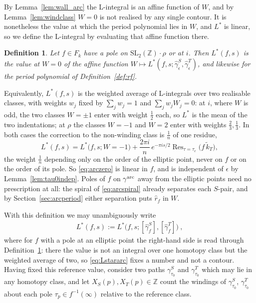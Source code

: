 \documentclass[11pt]{article}
\newtheorem{definition}[theorem]{Definition}
\newcommand{\ZZ}{\mathbb{Z}}
\newcommand{\SLZ}{\mathrm{SL}_2(\ZZ)}
\newcommand{\tk}{\widetilde{k}_T}
\DeclareMathOperator{\Res}{Res}
\begin{document}
By Lemma~\ref{lem:wall_arc} the L-integral is an affine function of $W$, and by
Lemma~\ref{lem:windclass} $W=0$ is not realised by any single contour. It is nonetheless the value
at which the period polynomial lies in $W$, and $L^*$ is linear, so we define the L-integral by
evaluating that affine function there.

\begin{definition}\label{def:arczero}
Let $f\in F_k$ have a pole on $\SLZ\!\cdot\!\rho$ or at $i$. Then $L^*(f,s)$ is the value at
$W=0$ of the affine function $W\mapsto L^*(f,s;\hat\gamma^S_\epsilon,\hat\gamma^T_\epsilon)$, and
likewise for the period polynomial of Definition~\ref{def:rf}.
\end{definition}

Equivalently, $L^*(f,s)$ is the weighted average of L-integrals over two realisable classes, with
weights $w_j$ fixed by $\sum_jw_j=1$ and $\sum_jw_jW_j=0$: at $i$, where $W$ is odd, the two
classes $W=\pm1$ enter with weight $\tfrac12$ each, so $L^*$ is the mean of the two indentations;
at $\rho$ the classes $W=-1$ and $W=2$ enter with weights $\tfrac23,\tfrac13$. In both cases the
correction to the non-winding class is $\tfrac1n$ of one residue,
\begin{equation}\label{eq:arczero}
L^*(f,s)=L^*\big(f,s;W=-1\big)+\frac{2\pi i}{n}\,e^{-\pi is/2}\Res_{\tau=\tau_e}\!\big(f\,\tk\big),
\end{equation}
the weight $\tfrac1n$ depending only on the order of the elliptic point, never on $f$ or on the
order of its pole. So \eqref{eq:arczero} is linear in $f$, and is independent of $\epsilon$ by
Lemma~\ref{lem:tau0indep}. Poles of $f$ on $\gamma^{\rm arc}$ away from the elliptic points need
no prescription at all: the spiral of \eqref{eq:arcspiral} already separates each $S$-pair, and by
Section~\ref{sec:arcperiod} either separation puts $\hat r_f$ in $W$.

With this definition we may unambiguously write
\begin{align}\label{eq:Lstararc}
L^*(f,s) := L^*\big(f, s; [\hat\gamma_f^S], [\hat\gamma_f^T]\big)~,
\end{align}
where for $f$ with a pole at an elliptic point the right-hand side is read through
Definition~\ref{def:arczero}: there the value is not an integral over one homotopy class but the
weighted average of two, so \eqref{eq:Lstararc} fixes a number and not a contour.
Having fixed this reference value, consider two paths $\gamma^S_{\tau_0}$ and
$\gamma^T_{\tau_0}$ which may lie in any homotopy class, and let $X_S(p),X_T(p)\in\ZZ$ count the
windings of $\gamma^S_{\tau_0}$, $\gamma^T_{\tau_0}$ about each pole $\tau_p\in f^{-1}(\infty)$
relative to the reference class.
\end{document}

